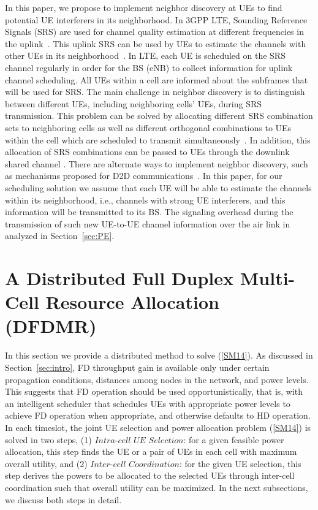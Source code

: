 \documentclass[journal]{IEEEtran}
\begin{document}
In this paper, we propose to implement neighbor discovery at UEs to find potential UE interferers in its neighborhood. In 3GPP LTE, Sounding Reference Signals (SRS) are used for channel quality estimation at different frequencies in the uplink~\cite{DahlmanLTE}. This uplink SRS can be used by UEs to estimate the channels with other UEs in its neighborhood~\cite{D2DneighborDisSRS}. In LTE, each UE is scheduled on the SRS channel regularly in order for the BS (eNB) to collect information for uplink channel scheduling. All UEs within a cell are informed about the subframes that will be used for SRS. The main challenge in neighbor discovery is to distinguish between different UEs, including neighboring cells' UEs, during SRS transmission. This problem can be solved by allocating different SRS combination sets to neighboring cells as well as different orthogonal combinations to UEs within the cell which are scheduled to transmit simultaneously~\cite{DahlmanLTE}. In addition, this allocation of SRS combinations can be passed to UEs through the downlink shared channel \cite{D2DneighborDisSRS}. There are alternate ways to implement neighbor discovery, such as mechanisms proposed for D2D communications~\cite{D2DneighborDisDMRS, D2DneighborDisFlashLinq}. In this paper, for our scheduling solution we assume that each UE will be able to estimate the channels within its neighborhood, i.e., channels with strong UE interferers, and this information will be transmitted to its BS. The signaling overhead during the transmission of such new UE-to-UE channel information over the air link in analyzed in Section~\ref{sec:PE}.

\section{A Distributed Full Duplex Multi-Cell Resource Allocation (DFDMR)}\label{sec:DFDMR}
In this section we provide a distributed method to solve (\ref{SM14}). As discussed in Section~\ref{sec:intro}, FD throughput gain is available only under certain propagation conditions, distances among nodes in the network, and power levels. This suggests that FD operation should be used opportunistically, that is, with an intelligent scheduler that schedules UEs with appropriate power levels to achieve FD operation when appropriate, and otherwise defaults to HD operation. In each timeslot, the joint UE selection and power allocation problem (\ref{SM14}) is solved in two steps, (1) $\textit  {Intra-cell UE Selection}$: for a given feasible power allocation, this step finds the UE or a pair of UEs in each cell with maximum overall utility, and (2) $\textit {Inter-cell Coordination} $: for the given UE selection, this step derives the powers to be allocated to the selected UEs through inter-cell coordination such that overall utility can be maximized. In the next subsections, we discuss both steps in detail. 
\end{document}
